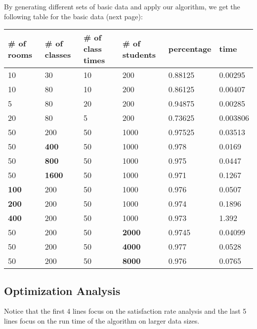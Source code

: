 \documentclass[11pt, oneside]{article}   	%
\begin{document}
By generating different sets of basic data and apply our algorithm, we get the following table for the basic data (next page):
\begin{table}[h]
\begin{tabular}{|l|l|l|l|l|l|}
\hline
\# of rooms & \# of classes & \# of class times & \# of students & percentage & time     \\ \hline
10          & 30            & 10                & 200            & 0.88125    & 0.00295  \\ \hline
10          & 80            & 10                & 200            & 0.86125    & 0.00407  \\ \hline
5           & 80            & 20                & 200            & 0.94875    & 0.00285  \\ \hline
20          & 80            & 5                 & 200            & 0.73625    & 0.003806 \\ \hline
\hline
50          & 200           & 50                & 1000           & 0.97525    & 0.03513  \\ \hline
\hline
50          & \textbf{400}           & 50                & 1000           & 0.978    & 0.0169  \\ \hline
50          & \textbf{800}           & 50                & 1000           & 0.975    & 0.0447  \\ \hline
50          & \textbf{1600}           & 50                & 1000           & 0.971    & 0.1267  \\ \hline
\textbf{100}          & 200           & 50                & 1000           & 0.976    & 0.0507  \\ \hline
\textbf{200}          & 200           & 50                & 1000           & 0.974    & 0.1896  \\ \hline
\textbf{400}          & 200           & 50                & 1000           & 0.973    & 1.392  \\ \hline
50          & 200           & 50                & \textbf{2000}           & 0.9745    & 0.04099  \\ \hline
50          & 200           & 50                & \textbf{4000}           & 0.977    & 0.0528  \\ \hline
50          & 200           & 50                & \textbf{8000}           & 0.976    & 0.0765  \\ \hline
\end{tabular}
\end{table}
\subsection{Optimization Analysis}
Notice that the first 4 lines focus on the satisfaction rate analysis and the last 5 lines focus on the run time of the algorithm on larger data sizes.
\end{document}
